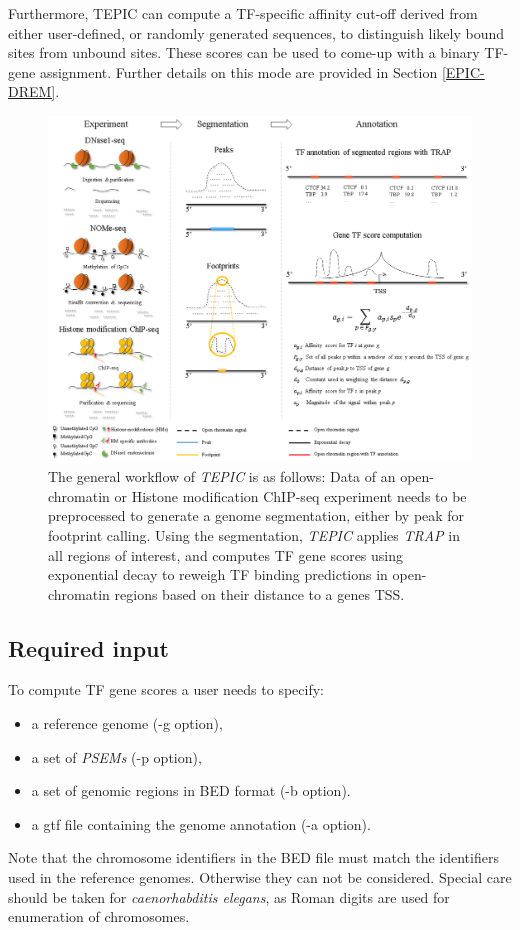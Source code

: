 \documentclass{article}
\begin{document}
Furthermore, TEPIC can compute a TF-specific affinity cut-off derived from either user-defined, or randomly generated sequences, to distinguish likely bound sites from unbound sites. These scores
can be used to come-up with a binary TF-gene assignment. Further details on this mode are provided in Section \ref{EPIC-DREM}.

\begin{figure}[h!]
\begin{center}
\includegraphics[width=\textwidth]{Workflow.png}
\end{center}
\caption{The general workflow of \textit{TEPIC} is as follows: 
Data of an open-chromatin or Histone modification ChIP-seq experiment needs to be preprocessed to generate a genome segmentation, 
either by peak for footprint calling. 
Using the segmentation, \textit{TEPIC} applies \textit{TRAP} in all regions of interest, and computes TF gene scores using exponential decay to reweigh 
TF binding predictions in open-chromatin regions based on their distance to a genes TSS.} 
\label{workflowFig}
\end{figure}

\subsection{Required input}
To compute TF gene scores a user needs to specify:
\begin{itemize}
\item a reference genome (-g option),
\item a set of \textit{PSEMs} (-p option),
\item a set of genomic regions in BED format (-b option).
\item a gtf file containing the genome annotation (-a option).
\end{itemize}
Note that the chromosome identifiers in the BED file must match the identifiers used in the reference genomes. Otherwise they can not be considered. 
Special care should be taken for \textit{caenorhabditis elegans}, as Roman digits are used for enumeration of chromosomes.
\end{document}
